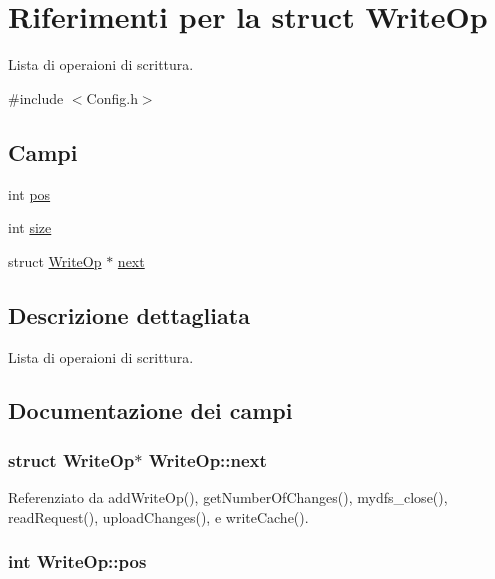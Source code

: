 \hypertarget{structWriteOp}{\section{Riferimenti per la struct Write\+Op}
\label{structWriteOp}
}


Lista di operaioni di scrittura.  




{\ttfamily \#include $<$Config.\+h$>$}

\subsection*{Campi}
\begin{DoxyCompactItemize}
\item 
int \hyperlink{structWriteOp_a0cd1c3d781c93b6feaaa5d01606fdc3d}{pos}
\item 
int \hyperlink{structWriteOp_af804d8a1e3d428ee7275b5e4f467d23a}{size}
\item 
struct \hyperlink{structWriteOp}{Write\+Op} $\ast$ \hyperlink{structWriteOp_ab10157ced397c43b41d1e77a6372a43c}{next}
\end{DoxyCompactItemize}


\subsection{Descrizione dettagliata}
Lista di operaioni di scrittura. 

\subsection{Documentazione dei campi}
\hypertarget{structWriteOp_ab10157ced397c43b41d1e77a6372a43c}{
\subsubsection[{next}]{\setlength{\rightskip}{0pt plus 5cm}struct {\bf Write\+Op}$\ast$ Write\+Op\+::next}}\label{structWriteOp_ab10157ced397c43b41d1e77a6372a43c}


Referenziato da add\+Write\+Op(), get\+Number\+Of\+Changes(), mydfs\+\_\+close(), read\+Request(), upload\+Changes(), e write\+Cache().

\hypertarget{structWriteOp_a0cd1c3d781c93b6feaaa5d01606fdc3d}{
\subsubsection[{pos}]{\setlength{\rightskip}{0pt plus 5cm}int Write\+Op\+::pos}}\label{structWriteOp_a0cd1c3d781c93b6feaaa5d01606fdc3d}


